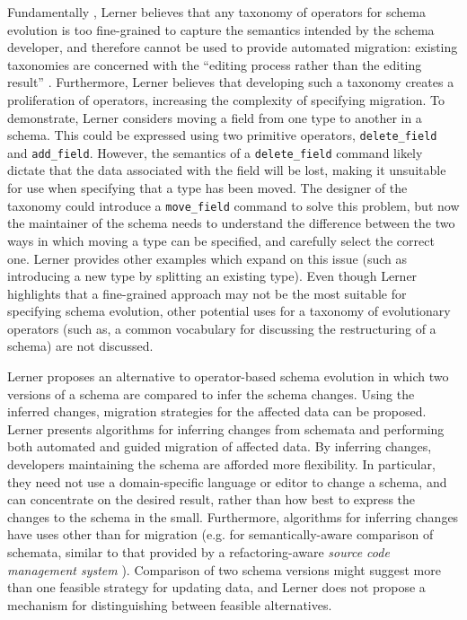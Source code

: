 Fundamentally \cc, Lerner believes that any taxonomy of operators for schema evolution is too fine-grained to capture the semantics intended by the schema developer, and therefore cannot be used to provide automated migration: existing taxonomies are concerned with the ``editing process rather than the editing result'' \cite{lerner00model}. Furthermore, Lerner believes that developing such a taxonomy creates a proliferation of operators, increasing the complexity of specifying migration. To demonstrate, Lerner  considers moving a field from one type to another in a schema. This could be expressed using two primitive operators, \verb|delete_field| and \verb|add_field|. However, the semantics of a \verb|delete_field| command likely dictate that the data associated with the field will be lost, making it unsuitable for use when specifying that a type has been moved. The designer of the taxonomy could introduce a \verb|move_field| command to solve this problem, but now the maintainer of the schema needs to understand the difference between the two ways in which moving a type can be specified, and carefully select the correct one. Lerner provides other examples which expand on this issue (such as introducing a new type by splitting an existing type). Even though Lerner highlights that a fine-grained approach may not be the most suitable for specifying schema evolution,  other potential uses for a taxonomy of evolutionary operators (such as, a common vocabulary for discussing the restructuring of a schema) are not discussed.

Lerner \cc proposes an alternative to operator-based schema evolution in which two versions of a schema are compared to infer the schema changes. Using the inferred changes, migration strategies for the affected data can be proposed. Lerner presents algorithms for inferring changes from schemata and performing both automated and guided migration of affected data. By inferring changes, developers maintaining the schema are afforded more flexibility. In particular, they need not use a domain-specific language or editor to change a schema, and can concentrate on the desired result, rather than how best to express the changes to the schema in the small. Furthermore, algorithms for inferring changes have uses other than for migration (e.g. for semantically-aware comparison of schemata, similar to that provided by a refactoring-aware \textit{source code management system} \cite{dig07cms}). Comparison of two schema versions might suggest more than one feasible strategy for updating data, and Lerner does not propose a mechanism for distinguishing between feasible alternatives.

